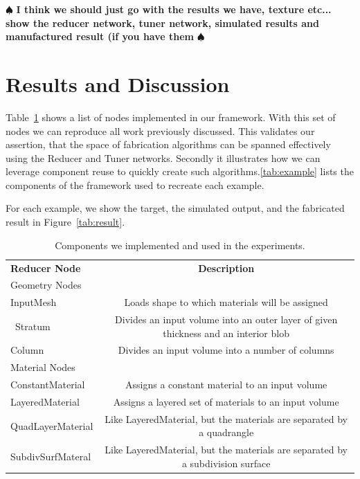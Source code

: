 \documentclass[annual]{acmsiggraph}
\newcommand{\note}[1]{\marginpar{\LARGE $\spadesuit$}
			$\spadesuit$ {\bf #1} $\spadesuit$}
\begin{document}
%
%
%
%

\note{I think we should just go with the results we have, texture etc... show the reducer network, tuner network, simulated results and manufactured result (if you have them}
\section{Results and Discussion}
Table~\ref{tab:built-in} shows a list of nodes implemented in our framework. With this set of nodes we can reproduce all work previously discussed. This validates our assertion, that the space of fabrication  algorithms can be spanned effectively using the Reducer and Tuner networks. Secondly it illustrates how we can leverage component reuse to quickly create such algorithms.\autoref{tab:example} lists the components of the framework used to recreate each example.

For each example, we show the target, the simulated output, and the fabricated result in Figure~\ref{tab:result}.


\begin{table}
\centering
\begin{tabular}{lc}
\hline 
\textbf{Reducer Node} & \textbf{Description} \\
Geometry Nodes &\\
\hline
InputMesh & Loads shape to which materials will be assigned\\\
Stratum & Divides an input volume into an outer layer of given thickness and an interior blob\\
Column & Divides an input volume into a number of columns\\
\hline
Material Nodes &\\
\hline
ConstantMaterial & Assigns a constant material to an input volume \\
LayeredMaterial &  Assigns a layered set of materials to an input volume \\
QuadLayerMaterial & Like LayeredMaterial, but the materials are separated by a quadrangle\\
SubdivSurfMateral & Like LayeredMaterial, but the materials are separated by a subdivision surface \\
\hline
\end{tabular}
\caption{Components we implemented and used in the experiments.}
\label{tab:built-in}
\end{table}
\end{document}
